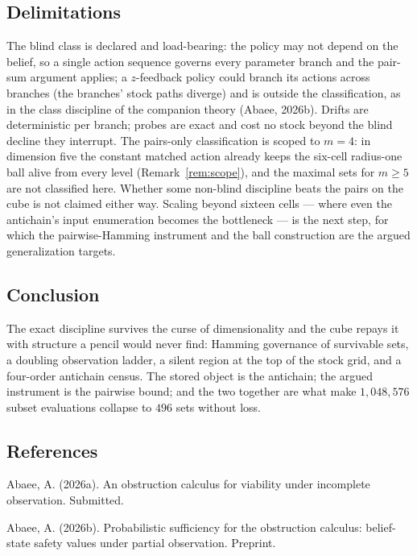 \documentclass[10pt,twocolumn]{article}
\theoremstyle{plain}
\theoremstyle{definition}
\theoremstyle{remark}
\begin{document}
\subsection{Delimitations}\label{scope}

The blind class is declared and load-bearing: the policy may not
depend on the belief, so a single action sequence governs every
parameter branch and the pair-sum argument applies; a
\(z\)-feedback policy could branch its actions across branches (the
branches' stock paths diverge) and is outside the classification, as in the class discipline of the companion theory (Abaee, 2026b). Drifts are
deterministic per branch; probes are exact and cost no stock beyond
the blind decline they interrupt. The pairs-only classification is scoped to
\(m = 4\): in dimension five the constant matched action already
keeps the six-cell radius-one ball alive from every level
(Remark~\ref{rem:scope}), and the maximal sets for \(m \ge 5\) are
not classified here. Whether some non-blind discipline
beats the pairs on the cube is not claimed either way. Scaling beyond
sixteen cells --- where even the antichain's input enumeration becomes
the bottleneck --- is the next step, for which the pairwise-Hamming
instrument and the ball construction are the argued generalization
targets.

\subsection{Conclusion}\label{conclusion}

The exact discipline survives the curse of dimensionality and the
cube repays it with structure a pencil would never find: Hamming
governance of survivable sets, a doubling observation ladder, a
silent region at the top of the stock grid, and a four-order
antichain census. The stored object is the antichain; the argued
instrument is the pairwise bound; and the two together are what make
\(1{,}048{,}576\) subset evaluations collapse to \(496\) sets without
loss.

\subsection*{References}

{\footnotesize
Abaee, A. (2026a). An obstruction calculus for viability under incomplete observation. Submitted.

Abaee, A. (2026b). Probabilistic sufficiency for the obstruction calculus: belief-state safety values under partial observation. Preprint.


}
\end{document}
